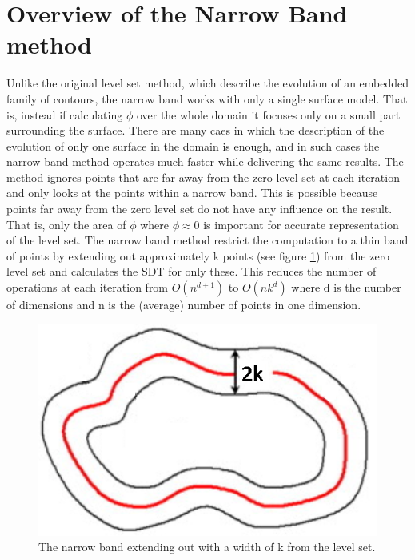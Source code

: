 \section{Overview of the Narrow Band method}
Unlike the original level set method, which describe the evolution of an embedded family of contours, the narrow band works with only a single surface model\cite{whitaker89}. That is, instead if calculating $\phi$ over the whole domain it focuses only on a small part surrounding the surface. There are many caes in which the description of the evolution of only one surface in the domain is enough, and in such cases the narrow band method operates much faster while delivering the same results. The method ignores points that are far away from the zero level set at each iteration and only looks at the points within a narrow band. This is possible because points far away from the zero level set do not have any influence on the result. That is, only the area of \(\phi\) where \(\phi \approx 0\) is important for accurate representation of the level set. The narrow band method restrict the computation to a thin band of points by extending out approximately k points (see figure \ref{narrowBand}) from the zero level set and calculates the SDT for only these. This reduces the number of operations at each iteration from \(O(n^{d+1})\) to \(O(nk^{d})\) \cite{adalsteinsson94} where d is the number of dimensions and n is the (average) number of points in one dimension. 
\begin{figure}[h!]
\centering
\includegraphics[width=.5\textwidth]{levelset/narrowBand}
\caption{The narrow band extending out with a width of k from the level set.}
\label{narrowBand}
\end{figure}
